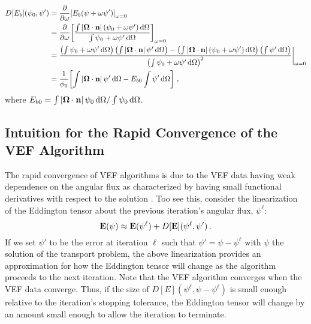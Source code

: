\documentclass[../doc.tex]{subfiles}
\begin{document}
	\begin{equation} \label{moment:Eb_deriv}
	\begin{aligned}
		D[E_b](\psi_0,\psi') &= \pderiv{}{\omega}\bracket{E_b(\psi + \omega\psi')}_{\omega=0} \\ 
		&= \pderiv{}{\omega}\bracket{\frac{\int |\Omegahat\cdot\n|\paren{\psi_0 + \omega\psi'} \ud \Omega}{\int \psi_0 + \omega\psi' \ud \Omega}}_{\omega=0} \\
		&= \frac{\paren{\int \psi_0 + \omega\psi' \ud \Omega}\paren{\int |\Omegahat\cdot\n|\,\psi'\ud\Omega} - \paren{\int |\Omegahat\cdot\n|\paren{\psi_0 + \omega\psi'}\ud\Omega}\paren{\int\psi'\ud\Omega}}{\paren{\int \psi_0 + \omega\psi' \ud \Omega}^2} \biggr\rvert_{\omega=0} \\
		&= \frac{1}{\phi_0}\bracket{\int |\Omegahat\cdot\n|\,\psi' \ud \Omega - E_{b0} \int \psi' \ud \Omega} \,,
	\end{aligned}
	\end{equation}
where $E_{b0} = \int |\boldsymbol{\Omega}\cdot\boldsymbol{\mathrm{n}}|\,\psi_0 \mathop{}\!\mathrm{d} \Omega / \int \psi_0 \mathop{}\!\mathrm{d} \Omega$. 

\subsection{Intuition for the Rapid Convergence of the VEF Algorithm} \label{moment_sec:rap_conv}
The rapid convergence of VEF algorithms is due to the VEF data having weak dependence on the angular flux as characterized by having small functional derivatives with respect to the solution \cite{goldin}. Too see this, consider the linearization of the Eddington tensor about the previous iteration's angular flux, $\psi^\ell$: 
	\begin{equation} \label{moment:edd_lin}
		\boldsymbol{\mathrm{E}}(\psi) \approx \boldsymbol{\mathrm{E}}(\psi^\ell) + D[\boldsymbol{\mathrm{E}}](\psi^\ell,\psi') \,. 
	\end{equation}
If we set $\psi'$ to be the error at iteration $\ell$ such that $\psi' = \psi - \psi^\ell$ with $\psi$ the solution of the transport problem, the above linearization provides an approximation for how the Eddington tensor will change as the algorithm proceeds to the next iteration. Note that the VEF algorithm converges when the VEF data converge. Thus, if the size of $D[E](\psi^\ell,\psi - \psi^\ell)$ is small enough relative to the iteration's stopping tolerance, the Eddington tensor will change by an amount small enough to allow the iteration to terminate. 
\end{document}

